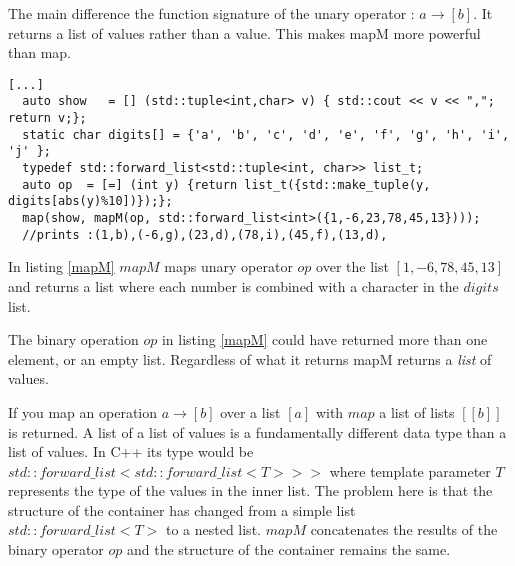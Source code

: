 \documentclass[12pt,fleqn]{article}
\begin{document}
The main difference the function signature of the unary operator : $a \rightarrow [b]$. 
It returns a list of values rather than a value. 
This makes mapM more powerful than map.
%
\begin{lstlisting}[caption=example of mapM, label=mapM] 
[...]
  auto show   = [] (std::tuple<int,char> v) { std::cout << v << ","; return v;};
  static char digits[] = {'a', 'b', 'c', 'd', 'e', 'f', 'g', 'h', 'i', 'j' };
  typedef std::forward_list<std::tuple<int, char>> list_t;
  auto op  = [=] (int y) {return list_t({std::make_tuple(y, digits[abs(y)%10])});};
  map(show, mapM(op, std::forward_list<int>({1,-6,23,78,45,13})));
  //prints :(1,b),(-6,g),(23,d),(78,i),(45,f),(13,d),
\end{lstlisting}
In listing \ref{mapM} $mapM$ maps unary operator $op$ over the list $[1,-6,78,45,13]$ and returns a list where each number is combined with  a character in the $digits$ list. 
%
\begin{comment}
\begin{lstlisting}[caption=comparing with map, label=mapMvsmap] 
[...]
  auto res = map(op, std::forward_list<int>({1,-6,23,78,45,13}));
  
  for (auto& el : res) {
    std::cout << "[";
    map(show, el);
    std::cout << "], ";
  }
  //prints :[(1,b),], [(-6,g),], [(23,d),], [(78,i),], [(45,f),], [(13,d),]
\end{lstlisting}
%
\end{comment}
%
%
The binary operation $op$ in listing \ref{mapM} could have returned more than one element, or an empty list.
Regardless of what it returns mapM returns a {\em list} of values.

If you map an operation $a \rightarrow [b]$ over a list $[a]$ with $map$ a list of lists $[[b]]$ is returned. %
A list of a list of values is a fundamentally different data type than a list of values. 
In C++ its type would be $std::forward\_list<std::forward\_list<T>>>$ where template parameter $T$ represents the type of the values in the inner list.
The problem here is that the structure of the container has changed from a simple list $std::forward\_list<T>$ to a nested list.
$mapM$ concatenates the results of the binary operator $op$ and the structure of the container remains the same.
\end{document}
